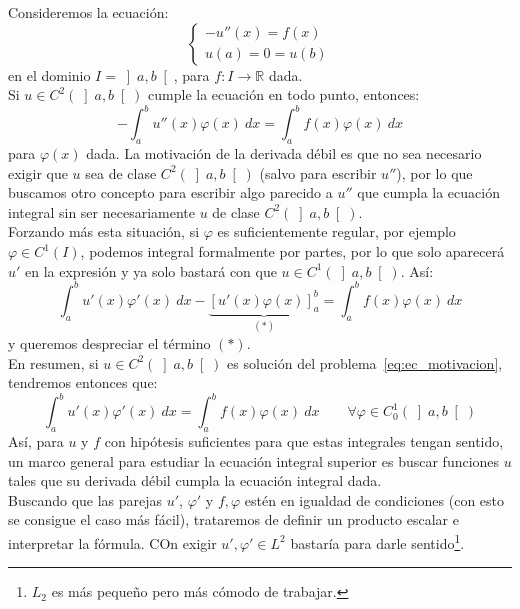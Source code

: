 \begin{ejemplo}
Consideremos la ecuación:
\begin{equation}\label{eq:ec_motivacion}
    \left\{\begin{array}{l}
        -u''(x) = f(x)  \\
        u(a) = 0 = u(b)
    \end{array}\right.
\end{equation}
en el dominio $I = \left]a,b\right[$, para $f:I\to \mathbb{R}$ dada.\\

\noindent
Si $u\in C^2(\left]a,b\right[)$ cumple la ecuación en todo punto, entonces:
\begin{equation*}
    -\int_{a}^{b} u''(x) \varphi(x)~dx  = \int_{a}^{b} f(x)\varphi(x)~dx  
\end{equation*}
para $\varphi(x)$ dada. La motivación de la derivada débil es que no sea necesario exigir que $u$ sea de clase $C^2(\left]a,b\right[)$ (salvo para escribir $u''$), por lo que buscamos otro concepto para escribir algo parecido a $u''$ que cumpla la ecuación integral sin ser necesariamente $u$ de clase $C^2(\left]a,b\right[)$.\\

\noindent
Forzando más esta situación, si $\varphi$ es suficientemente regular, por ejemplo $\varphi \in C^1(I)$, podemos integral formalmente por partes, por lo que solo aparecerá $u'$ en la expresión y ya solo bastará con que $u\in C^1(\left]a,b\right[)$. Así:
\begin{equation}\label{eq:ast_despreciar}
    \int_{a}^{b} u'(x)\varphi'(x)~dx  - \underbrace{[u'(x)\varphi(x)]_a^b}_{(\ast)} = \int_{a}^{b} f(x)\varphi(x)~dx 
\end{equation}
y queremos despreciar el término $(\ast)$.\\

\noindent
En resumen, si $u\in C^2(\left]a,b\right[)$ es solución del problema~\eqref{eq:ec_motivacion}, tendremos entonces que:
\begin{equation*}
    \int_{a}^{b} u'(x)\varphi'(x)~dx  = \int_{a}^{b} f(x)\varphi(x)~dx \qquad \forall \varphi \in C^1_0(\left]a,b\right[)
\end{equation*}
Así, para $u$ y $f$ con hipótesis suficientes para que estas integrales tengan sentido, un marco general para estudiar la ecuación integral superior es buscar funciones $u$ tales que su derivada débil cumpla la ecuación integral dada.\\

\noindent
Buscando que las parejas $u'$, $\varphi'$ y $f,\varphi$ estén en igualdad de condiciones (con esto se consigue el caso más fácil), trataremos de definir un producto escalar e interpretar la fórmula. COn exigir $u',\varphi'\in L^2$ bastaría para darle sentido\footnote{$L_2$ es más pequeño pero más cómodo de trabajar.}.
\end{ejemplo}


